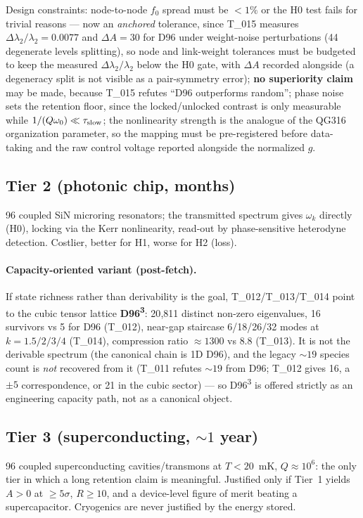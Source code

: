 \documentclass[11pt,a4paper]{article}
\newcommand{\ls}[1]{\ensuremath{\lambda_{#1}}}
\newcommand{\w}[1]{\ensuremath{\omega_{#1}}}
\begin{document}
\noindent Design constraints: node-to-node $f_0$ spread must be $<1\%$ or the H0 test fails for
trivial reasons --- now an \emph{anchored} tolerance, since T\_015 measures
$\Delta\ls{2}/\ls{2}=0.0077$ and $\Delta A=30$ for D96 under weight-noise perturbations (44
degenerate levels splitting), so node and link-weight tolerances must be budgeted to keep the
measured $\Delta\ls{2}/\ls{2}$ below the H0 gate, with $\Delta A$ recorded alongside (a degeneracy
split is not visible as a pair-symmetry error); \textbf{no superiority claim} may be made, because
T\_015 refutes ``D96 outperforms random''; phase noise sets the retention floor, since the
locked/unlocked contrast is only measurable while $1/(Q\w{0})\ll\tau_{\rm slow}$; the nonlinearity
strength is the analogue of the QG316 organization parameter, so the mapping must be pre-registered
before data-taking and the raw control voltage reported alongside the normalized $g$.

\subsection{Tier 2 (photonic chip, months)}
96 coupled SiN microring resonators; the transmitted spectrum gives $\w{k}$ directly (H0), locking
via the Kerr nonlinearity, read-out by phase-sensitive heterodyne detection. Costlier, better for
H1, worse for H2 (loss).

\paragraph{Capacity-oriented variant (post-fetch).} If state richness rather than derivability is the
goal, T\_012/T\_013/T\_014 point to the cubic tensor lattice \textbf{D96\textsuperscript{3}}:
20{,}811 distinct non-zero eigenvalues, 16 survivors vs 5 for D96 (T\_012), near-gap staircase
6/18/26/32 modes at $k=1.5/2/3/4$ (T\_014), compression ratio ${\approx}1300$ vs $8.8$ (T\_013). It
is not the derivable spectrum (the canonical chain is 1D D96), and the legacy ${\sim}19$ species
count is \emph{not} recovered from it (T\_011 refutes ${\sim}19$ from D96; T\_012 gives 16, a
$\pm5$ correspondence, or 21 in the cubic sector) --- so D96\textsuperscript{3} is offered strictly
as an engineering capacity path, not as a canonical object.

\subsection{Tier 3 (superconducting, ${\sim}1$ year)}
96 coupled superconducting cavities/transmons at $T<20$~mK, $Q\approx10^{6}$: the only tier in which
a long retention claim is meaningful. Justified only if Tier~1 yields $A>0$ at $\ge5\sigma$,
$R\ge10$, and a device-level figure of merit beating a supercapacitor. Cryogenics are never
justified by the energy stored.
\end{document}
